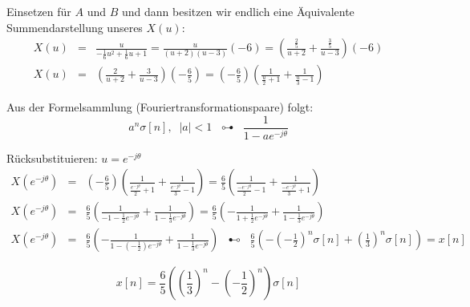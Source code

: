 \begin{uebsp}
\begin{Answer}
\begin{enumerate}[a)]
        Einsetzen für $A$ und $B$ und dann besitzen wir endlich eine Äquivalente Summendarstellung unseres
        $X(u)$:
        \begin{eqnarray*}
            X\left(u\right) &=&
                \frac{u}{-\frac{1}{6}u^2+\frac{1}{6}u+1}=\frac{u}{(u+2)(u-3)}\left(-6\right)
            =\left(\frac{\frac{2}{5}}{u+2}+\frac{\frac{3}{5}}{u-3}\right)\left(-6\right)\\
            X\left(u\right) &=&
            \left(\frac{2}{u+2}+\frac{3}{u-3}\right)\left(-\frac{6}{5}\right)
            =\left(-\frac{6}{5}\right)\left(\frac{1}{\frac{u}{2}+1}+\frac{1}{\frac{u}{3}-1}\right)
    \end{eqnarray*}
        \begin{uebsp_theory}
            Aus der Formelsammlung (Fouriertransformationspaare) folgt:
            \[a^n\sigma[n],\;\;|a|<1\;\;\multimapdotbothA\;\;\frac{1}{1-ae^{-j\theta}}\]
        \end{uebsp_theory}
    Rücksubstituieren: $u=e^{-j\theta}$
        \begin{eqnarray*}
            X\left(e^{-j\theta}\right) &=&
            \left(-\frac{6}{5}\right)\left(\frac{1}{\frac{e^{-j\theta}}{2}+1}+\frac{1}{\frac{e^{-j\theta}}{3}-1}\right)=\frac{6}{5}\left(\frac{1}{\frac{-e^{-j\theta}}{2}-1}+\frac{1}{\frac{-e^{-j\theta}}{3}+1}\right)\\
            X\left(e^{-j\theta}\right) &=&
            \frac{6}{5}\left(\frac{1}{-1-\frac{1}{2}e^{-j\theta}}+\frac{1}{1-\frac{1}{3}e^{-j\theta}}\right)
            = 
            \frac{6}{5}\left(-\frac{1}{1+\frac{1}{2}e^{-j\theta}}+\frac{1}{1-\frac{1}{3}e^{-j\theta}}\right)\\
            X\left(e^{-j\theta}\right) &=&
            \frac{6}{5}\left(-\frac{1}{1-\left(-\frac{1}{2}\right)e^{-j\theta}}+\frac{1}{1-\frac{1}{3}e^{-j\theta}}\right)\;\;\multimapdotbothB\;\;
            \frac{6}{5}\left(-\left(-\frac{1}{2}\right)^n\sigma[n]+\left(\frac{1}{3}\right)^n\sigma[n]\right)
            = x[n]
    \end{eqnarray*}

    \[x[n]=\frac{6}{5}\left(\left(\frac{1}{3}\right)^n-\left(-\frac{1}{2}\right)^n\right)\sigma[n]\]
\end{enumerate}
\end{Answer}
\end{uebsp}

